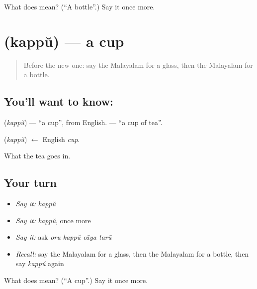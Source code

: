 \begin{tcolorbox}[breakable,colback=teal!4,colframe=teal!35!black,title={Before you move on}]
What does  mean? (\textquotedblleft{}A bottle\textquotedblright{}.) Say it once more.
\end{tcolorbox}
\section[\texorpdfstring{\ml{കപ്പ്} (kappŭ)}{കപ്പ് (kappŭ)}]{ (kappŭ) — a cup}

\label{lesson:ML-C134-cup}



\begin{quote}
Before the new one: say the Malayalam for a glass, then the Malayalam for a bottle.
\end{quote}

\subsection*{You'll want to know: }
\textbf{} (\emph{kappŭ}) — \textquotedblleft{}a cup\textquotedblright{}, from English. \textbf{  } — \textquotedblleft{}a cup of tea\textquotedblright{}.

\begin{cousinweb}
\textbf{} (\emph{kappŭ}) $\leftarrow$ English \emph{cup}.
\end{cousinweb}

\begin{grammarlens}[title={What you've built}]
What the tea goes in.
\end{grammarlens}

\subsection*{Your turn}
\begin{itemize}
\raggedright
  \item \emph{Say it:} \emph{kappŭ}
  \item \emph{Say it:} \emph{kappŭ}, once more
  \item \emph{Say it:} ask \emph{oru kappŭ cāya tarū}
  \item \emph{Recall:} say the Malayalam for a glass, then the Malayalam for a bottle, then say \emph{kappŭ} again
\end{itemize}

\begin{tcolorbox}[breakable,colback=teal!4,colframe=teal!35!black,title={Before you move on}]
What does  mean? (\textquotedblleft{}A cup\textquotedblright{}.) Say it once more.
\end{tcolorbox}
